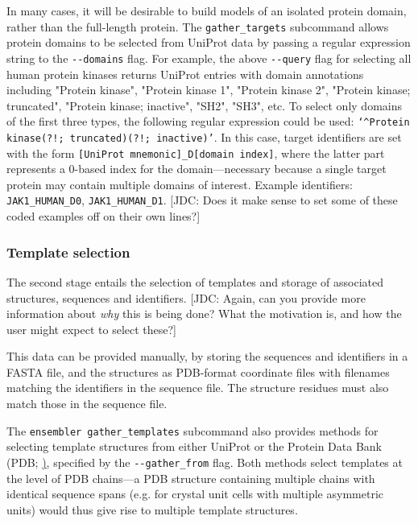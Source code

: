 \documentclass[aps,pre,twocolumn,nofootinbib,superscriptaddress,linenumbers]{revtex4-1}
\begin{document}
In many cases, it will be desirable to build models of an isolated protein domain, rather than the full-length protein.
The {\tt gather\_targets} subcommand allows protein domains to be selected from UniProt data by passing a regular expression string to the {\tt -{}-domains} flag. 
For example, the above {\tt -{}-query} flag for selecting all human protein kinases returns UniProt entries with domain annotations including "Protein kinase", "Protein kinase 1", "Protein kinase 2", "Protein kinase; truncated", "Protein kinase; inactive", "SH2", "SH3", etc.
To select only domains of the first three types, the following regular expression could be used: {\tt`\^{}Protein kinase(?!; truncated)(?!; inactive)'}.
In this case, target identifiers are set with the form {\tt [UniProt mnemonic]\_D[domain index]}, where the latter part represents a 0-based index for the domain---necessary because a single target protein may contain multiple domains of interest.
Example identifiers: {\tt JAK1\_HUMAN\_D0}, {\tt JAK1\_HUMAN\_D1}.
{\color{red}[JDC: Does it make sense to set some of these coded examples off on their own lines?]}

\subsubsection{Template selection}

The second stage entails the selection of templates and storage of associated structures, sequences and identifiers.
{\color{red}[JDC: Again, can you provide more information about \emph{why} this is being done? What the motivation is, and how the user might expect to select these?]}

This data can be provided manually, by storing the sequences and identifiers in a FASTA file, and the structures as PDB-format coordinate files with filenames matching the identifiers in the sequence file.
The structure residues must also match those in the sequence file.

The {\tt ensembler gather\_templates} subcommand also provides methods for selecting template structures from either UniProt or the Protein Data Bank (PDB; \href{http://www.rcsb.org/pdb}), specified by the {\tt -{}-gather\_from} flag.
Both methods select templates at the level of PDB chains---a PDB structure containing multiple chains with identical sequence spans (e.g. for crystal unit cells with multiple asymmetric units) would thus give rise to multiple template structures.

\end{document}
